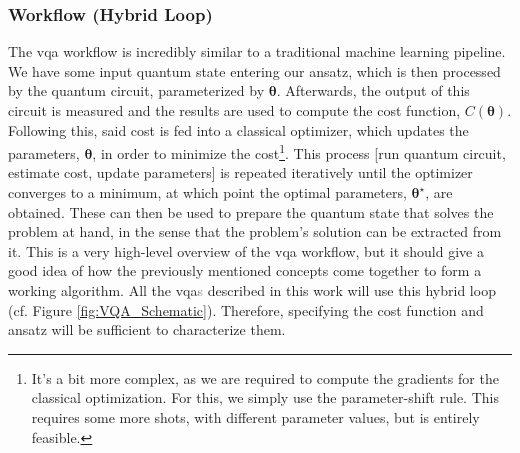 \subsubsection*{\small Workflow (Hybrid Loop)}
The \acrshort{vqa} workflow is incredibly similar to a traditional machine learning pipeline. We have some input quantum state entering our ansatz, which is then processed by the quantum circuit, parameterized by $\boldsymbol{\theta}$. Afterwards, the output of this circuit is measured and the results are used to compute the cost function, $C(\boldsymbol{\theta})$. Following this, said cost is fed into a classical optimizer, which updates the parameters, $\boldsymbol{\theta}$, in order to minimize the cost\footnote{It's a bit more complex, as we are required to compute the gradients for the classical optimization. For this, we simply use the parameter-shift rule. This requires some more shots, with different parameter values, but is entirely feasible.}. This process [run quantum circuit, estimate cost, update parameters] is repeated iteratively until the optimizer converges to a minimum, at which point the optimal parameters, $\boldsymbol{\theta}^{\star}$, are obtained. These can then be used to prepare the quantum state that solves the problem at hand, in the sense that the problem's solution can be extracted from it. This is a very high-level overview of the \acrshort{vqa} workflow, but it should give a good idea of how the previously mentioned concepts come together to form a working algorithm. All the \acrshort{vqa}\textcolor{gray}{s} described in this work will use this hybrid loop (cf. Figure \ref{fig:VQA_Schematic}). Therefore, specifying the cost function and ansatz will be sufficient to characterize them.

